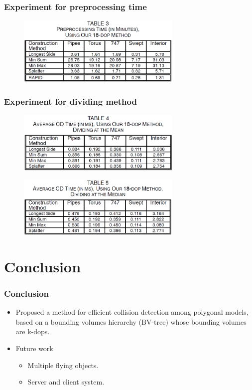\documentclass{beamer}
\begin{document}
	\begin{frame}
	\frametitle{Experiment for preprocessing time}
	\begin{figure}[h!]
		\centering
		\includegraphics[width=0.7\textwidth]{./figure/TABLE3.PNG}
	\end{figure}
	\end{frame}

	\begin{frame}
	\frametitle{Experiment for dividing method}
	\begin{figure}[h!]
		\centering
		\includegraphics[width=0.7\textwidth]{./figure/TABLE4.PNG}
	\end{figure}
	\begin{figure}[h!]
		\centering
		\includegraphics[width=0.7\textwidth]{./figure/TABLE5.PNG}
	\end{figure}
	\end{frame}

\section{Conclusion}

\begin{frame}
\frametitle{Conclusion}
\begin{itemize}
	\item Proposed a method for efficient collision detection among polygonal models, based on a bounding volumes hierarchy (BV-tree) whose bounding volumes are k-dops.
	\item Future work
		\begin{itemize}
		\item Multiple flying objects.
		\item Server and client system.
		\end{itemize}
\end{itemize}
\end{frame}
\end{document}
